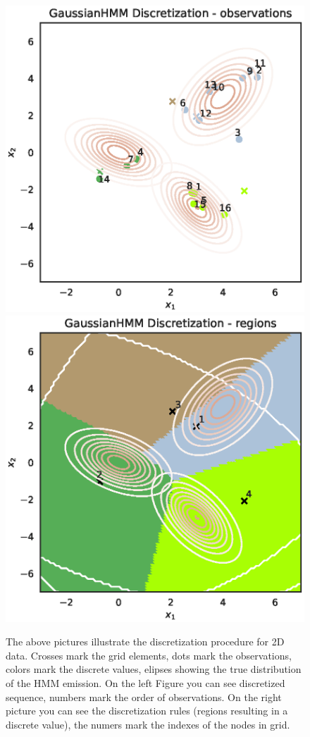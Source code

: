 \documentclass[shortabstract]{iithesis}
\begin{document}
\begin{figure}[!ht]
    \centering
    \includegraphics[scale=0.54]{cont_cooc_example.eps}
    \includegraphics[scale=0.54]{cont_cooc_example_regions.eps}
    \caption{The above pictures illustrate the discretization procedure for 2D data. Crosses mark the grid elements, dots mark the observations, colors mark the discrete values, elipses showing the true distribution of the HMM emission. On the left Figure you can see discretized sequence, numbers mark the order of observations. On the right picture you can see the discretization rules (regions resulting in a discrete value), the numers mark the indexes of the nodes in grid.}
    \label{fig:cont_cooc}
\end{figure}
\pagebreak
\end{document}

